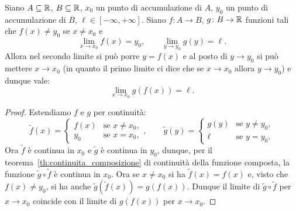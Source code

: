 \begin{theorem}
\label{th:limite_composta}
Siano $A\subseteq {\mathbb R}$, $B\subseteq {\mathbb R}$,
$x_0$ un punto di accumulazione di $A$,
$y_0$ un punto di accumulazione di $B$,
$\ell\in [-\infty,+\infty]$.
Siano $f\colon A \to B$, $g\colon B\to {\mathbb R}$
funzioni tali che $f(x)\neq y_0$ se $x\neq x_0$ e 
\[
  \lim_{x\to x_0} f(x) = y_0,
\qquad
  \lim_{y\to y_0} g(y) = \ell.
\]
Allora nel secondo limite si può porre $y=f(x)$ e al posto di $y\to y_0$ 
si può mettere $x\to x_0$ (in quanto il primo limite ci dice che se $x\to x_0$ 
allora $y\to y_0$) e dunque vale:
\[
 \lim_{x\to x_0} g(f(x)) = \ell.
\]
\end{theorem}
%
\begin{proof}
Estendiamo $f$ e $g$ per continuità:
\[
  \tilde f(x) = \begin{cases}
    f(x) & \text{se $x\neq x_0$},\\
    y_0 & \text{se $x=x_0$},
  \end{cases}, \qquad
  \tilde g(y) = \begin{cases}
    g(y) & \text{se $y\neq y_0$},\\
    \ell & \text{se $y=y_0$}.
  \end{cases}
\]
Ora $\tilde f$ è continua in $x_0$ e $\tilde g$ è continua in $y_0$,
dunque, per il teorema~\ref{th:continuita_composizione} di continuità
della funzione composta, la funzione $\tilde g \circ \tilde f$ è continua in $x_0$.
Ora se $x\neq x_0$ si ha $\tilde f(x)=f(x)$ e,
visto che $f(x)\neq y_0$, si ha anche $\tilde g(\tilde f(x)) = g(f(x))$.
Dunque il limite di $\tilde g \circ \tilde f$ per $x\to x_0$ coincide con il limite di $g(f(x))$ per $x\to x_0$.
\end{proof}
%

